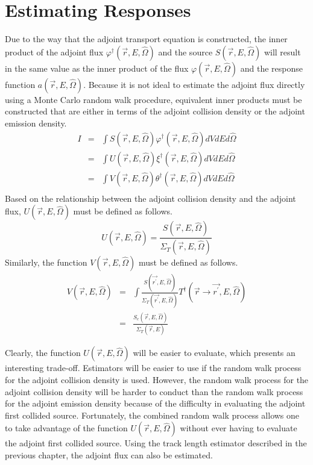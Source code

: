 \section{Estimating Responses}
Due to the way that the adjoint transport equation is constructed, the inner
product of the adjoint flux $\varphi^{\dagger}(\vec{r},E,\hat{\Omega})$ and the
source $S(\vec{r},E,\hat{\Omega})$ will result in the same value as the inner 
product of the flux $\varphi(\vec{r},E,\hat{\Omega})$ and the response
function $a(\vec{r},E,\hat{\Omega})$. Because it is not ideal to estimate the
adjoint flux directly using a Monte Carlo random walk procedure, equivalent
inner products must be constructed that are either in terms of the adjoint
collision density or the adjoint emission density.
\begin{eqnarray}
  I & = & \int S(\vec{r},E,\hat{\Omega})\varphi^{\dagger}(\vec{r},E,\hat{\Omega})
  dV dE d\hat{\Omega} \\ 
  & = & \int U(\vec{r},E,\hat{\Omega})\xi^{\dagger}(\vec{r},E,\hat{\Omega})
  dV dE d\hat{\Omega} \\
  & = & \int V(\vec{r},E,\hat{\Omega})\theta^{\dagger}(\vec{r},E,\hat{\Omega})
  dV dE d\hat{\Omega} \\
\end{eqnarray}
Based on the relationship between the adjoint collision density and the
adjoint flux, $U(\vec{r},E,\hat{\Omega})$ must be defined as follows.
\begin{equation}
  U(\vec{r},E,\hat{\Omega}) = \frac{S(\vec{r},E,\hat{\Omega})}
                                   {\Sigma_T(\vec{r},E,\hat{\Omega})}
\end{equation}
Similarly, the function $V(\vec{r},E,\hat{\Omega})$ must be defined as follows.
\begin{eqnarray}
  V(\vec{r},E,\hat{\Omega}) & = & \int \frac{S(\vec{r^{'}},E,\hat{\Omega})}
  {\Sigma_T(\vec{r^{'}},E,\hat{\Omega})} 
  T^{\dagger}(\vec{r} \to \vec{r^{'}},E,\hat{\Omega}) \\
  & = & \frac{S_c(\vec{r},E,\hat{\Omega})}{\Sigma_T(\vec{r},E)}
\end{eqnarray}

Clearly, the function $U(\vec{r},E,\hat{\Omega})$ will be easier to evaluate,
which presents an interesting trade-off. Estimators will be easier to use if
the random walk process for the adjoint collision density is used. However, 
the random walk process for the adjoint collision density will be harder to 
conduct than the random walk process for the adjoint emission density because
of the difficulty in evaluating the adjoint first collided source. Fortunately,
the combined random walk process allows one to take advantage of the function
$U(\vec{r},E,\hat{\Omega})$ without ever having to evaluate the adjoint first 
collided source. Using the track length estimator described in the previous
chapter, the adjoint flux can also be estimated. 
